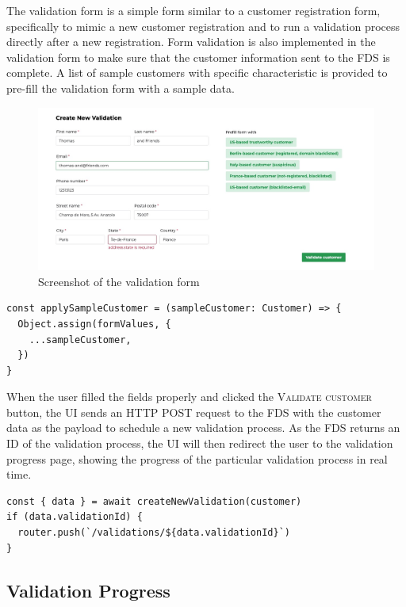     The validation form is a simple form similar to a customer registration form, specifically to mimic a new customer registration and to run a validation process directly after a new registration. Form validation is also implemented in the validation form to make sure that the customer information sent to the FDS is complete. A list of sample customers with specific characteristic is provided to pre-fill the validation form with a sample data. 

    \begin{figure}[!ht]
      \includegraphics[width=\textwidth]{images/ss_customer_form.jpeg}
      \caption{Screenshot of the validation form}
    \end{figure}

    \begin{lstlisting}[style=es6, caption={Prefilling form values with a sample customer data (TypeScript)}]
const applySampleCustomer = (sampleCustomer: Customer) => {
  Object.assign(formValues, {
    ...sampleCustomer,
  })
}
    \end{lstlisting}

    When the user filled the fields properly and clicked the \textsc{Validate customer} button, the UI sends an HTTP POST request to the FDS with the customer data as the payload to schedule a new validation process. As the FDS returns an ID of the validation process, the UI will then redirect the user to the validation progress page, showing the progress of the particular validation process in real time. 

    \begin{lstlisting}[style=es6, caption={ (TypeScript)}]
const { data } = await createNewValidation(customer)
if (data.validationId) {
  router.push(`/validations/${data.validationId}`)
}
    \end{lstlisting}

  \subsection{Validation Progress}
  
